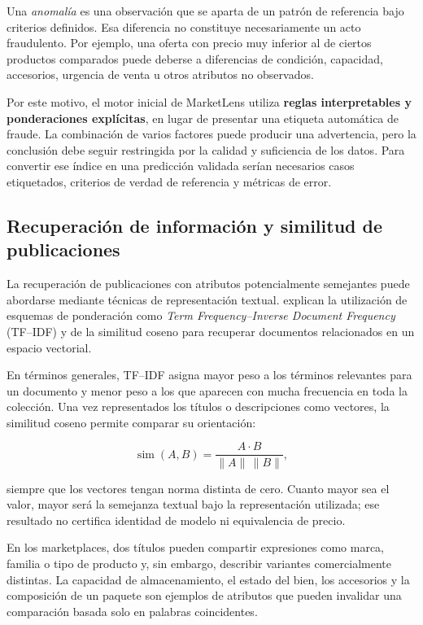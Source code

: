 Una \emph{anomalía} es una observación que se aparta de un patrón de referencia bajo criterios definidos. Esa diferencia no constituye necesariamente un acto fraudulento. Por ejemplo, una oferta con precio muy inferior al de ciertos productos comparados puede deberse a diferencias de condición, capacidad, accesorios, urgencia de venta u otros atributos no observados.

Por este motivo, el motor inicial de MarketLens utiliza \textbf{reglas interpretables y ponderaciones explícitas}, en lugar de presentar una etiqueta automática de fraude. La combinación de varios factores puede producir una advertencia, pero la conclusión debe seguir restringida por la calidad y suficiencia de los datos. Para convertir ese índice en una predicción validada serían necesarios casos etiquetados, criterios de verdad de referencia y métricas de error.

\subsection{Recuperación de información y similitud de publicaciones}\label{subsec:ml-fundamento-similitud}

La recuperación de publicaciones con atributos potencialmente semejantes puede abordarse mediante técnicas de representación textual. \textcite{ml-manning-2008} explican la utilización de esquemas de ponderación como \emph{Term Frequency--Inverse Document Frequency} (TF--IDF) y de la similitud coseno para recuperar documentos relacionados en un espacio vectorial.

En términos generales, TF--IDF asigna mayor peso a los términos relevantes para un documento y menor peso a los que aparecen con mucha frecuencia en toda la colección. Una vez representados los títulos o descripciones como vectores, la similitud coseno permite comparar su orientación:

\begin{equation}
    \operatorname{sim}(A,B)=\frac{A\cdot B}{\lVert A\rVert\,\lVert B\rVert},
    \label{eq:ml-coseno}
\end{equation}

siempre que los vectores tengan norma distinta de cero. Cuanto mayor sea el valor, mayor será la semejanza textual bajo la representación utilizada; ese resultado no certifica identidad de modelo ni equivalencia de precio.

En los marketplaces, dos títulos pueden compartir expresiones como marca, familia o tipo de producto y, sin embargo, describir variantes comercialmente distintas. La capacidad de almacenamiento, el estado del bien, los accesorios y la composición de un paquete son ejemplos de atributos que pueden invalidar una comparación basada solo en palabras coincidentes.


